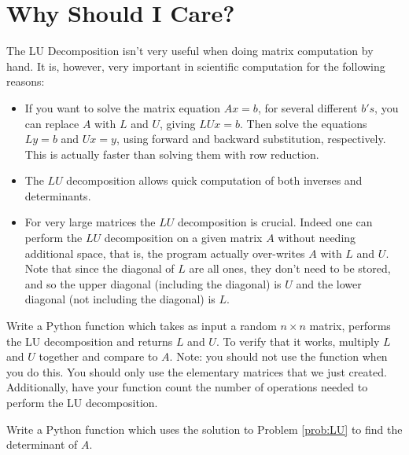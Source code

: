 \section*{Why Should I Care?}

The LU Decomposition isn't very useful when doing matrix computation
by hand.  It is, however, very important in scientific computation
for the following reasons:
\begin{itemize}
\item If you want to solve the matrix equation $A x = b$, for several different $b's$, you can replace $A$ with $L$ and $U$, giving $L U x = b$.  Then solve the equations $L y = b$ and $U x = y$, using forward and backward substitution, respectively.  This is actually faster than solving them with row reduction.
\item The $LU$ decomposition allows quick computation of both inverses and determinants.
\item For very large matrices the $LU$ decomposition is crucial.  Indeed one can perform the $LU$ decomposition on a given matrix $A$ without needing additional space, that is, the program actually over-writes $A$ with $L$ and $U$.  Note that since the diagonal of $L$ are all ones, they don't need to be stored, and so the upper diagonal (including the diagonal) is $U$ and the lower diagonal (not including the diagonal) is $L$.
\end{itemize}

\begin{problem}
\label{prob:LU}
Write a Python function which takes as input
a random $n\times n$ matrix, performs the LU decomposition and
returns $L$ and $U$.  To verify that it works, multiply $L$ and $U$ together
and compare to $A$. Note: you should not use the  function when you do this. You should only use the elementary matrices that we just created.
Additionally, have your function count the number of operations needed to perform the LU decomposition.
\end{problem}

\begin{problem}
\label{prob:det}
Write a Python function which uses the solution to Problem \ref{prob:LU} to find the determinant of $A$.
\end{problem}
